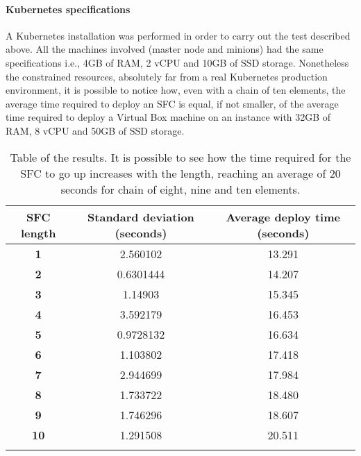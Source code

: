 \paragraph*{Kubernetes specifications}
A Kubernetes installation was performed in order to carry out the test
described above. All the machines involved (master node and minions) had the
same specifications i.e., 4GB of RAM, 2 vCPU and 10GB of SSD storage.
Nonetheless the constrained resources, absolutely far from a real Kubernetes
production environment, it is possible to notice how, even with a chain of ten
elements, the average time required to deploy an SFC is equal, if not smaller,
of the average time required to deploy a Virtual Box machine on an instance 
with 32GB of RAM, 8 vCPU and 50GB of SSD storage.

\newpage

\begin{longtable}[c]{c|c|c}
\textbf{SFC length} & \textbf{Standard deviation (seconds)} & \textbf{Average 
deploy time (seconds)} \\ \hline
\endhead
%
\textbf{1}          & 2.560102                   & 13.291                     \\
\textbf{2}          & 0.6301444                  & 14.207                     \\
\textbf{3}          & 1.14903                    & 15.345                     \\
\textbf{4}          & 3.592179                   & 16.453                     \\
\textbf{5}          & 0.9728132                  & 16.634                     \\
\textbf{6}          & 1.103802                   & 17.418                     \\
\textbf{7}          & 2.944699                   & 17.984                     \\
\textbf{8}          & 1.733722                   & 18.480                     \\
\textbf{9}          & 1.746296                   & 18.607                     \\
\textbf{10}         & 1.291508                   & 20.511                     \\
\caption[SFC start up time]{Table of the results. It is possible to see how the
  time required for the SFC to go up increases with the length, reaching an
  average of 20 seconds for chain of eight, nine and ten elements.}
\label{chap:tests:sec:sfclength:tab:sfcdata}\\
\end{longtable}


